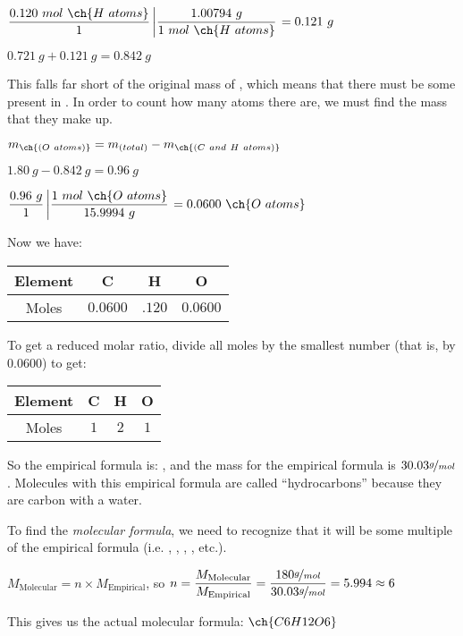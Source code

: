 \documentclass[12pt, openany, letterpaper]{memoir}
\begin{document}
\vspace{0.5em}
$\dfrac{0.120~mol~\ch{H~atoms}}{1}\left|\dfrac{1.00794~g}{1~mol~\ch{H~atoms}}\right. =0.121~g$

\vspace{0.5em}
$0.721~g + 0.121~g = 0.842~g$

This falls far short of the original mass of , which means that there must be some  present in . In order to count how many  atoms there are, we must find the mass that they make up.

$m_{\ch{(O~atoms)}} = m_{(total)} - m_{\ch{(C~and~H~atoms)}}$

\vspace{0.5em}
$1.80~g - 0.842~g = 0.96~g$

\vspace{0.5em}
$\dfrac{0.96~g}{1}\left|\dfrac{1~mol~\ch{O~atoms}}{15.9994~g}\right. = 0.0600~\ch{O~atoms}$

Now we have:

\begin{tabular}{c|c|c|c}
Element & C & H & O \\ \midrule
Moles & $0.0600$ & $.120$ & $0.0600$
\end{tabular}

To get a reduced molar ratio, divide all moles by the smallest number (that is, by $0.0600$) to get:

\begin{tabular}{c|c|c|c}
Element & C & H & O \\ \midrule
Moles & $1$ & $2$ & $1$
\end{tabular}

So the empirical formula is: , and the mass for the empirical formula is $30.03\nicefrac{g}{mol}$. Molecules with this empirical formula are called ``hydrocarbons'' because they are carbon with a water.

To find the \emph{molecular formula}, we need to recognize that it will be some multiple of the empirical formula (i.e. , , , , etc.).

$M_{\mathrm{Molecular}} = n\times M_{\mathrm{Empirical}}$, so $n = \dfrac{M_{\mathrm{Molecular}}}{M_{\mathrm{Empirical}}} = \dfrac{180\nicefrac{g}{mol}}{30.03\nicefrac{g}{mol}}=5.994\approx 6$

This gives us the actual molecular formula: $\ch{C6H12O6}$
\end{document}
